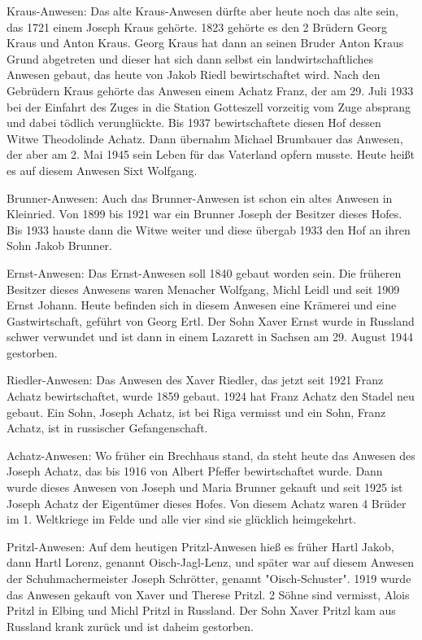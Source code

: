 Kraus-Anwesen: Das alte Kraus-Anwesen dürfte aber heute noch das alte sein, das
1721 einem Joseph Kraus gehörte. 1823 gehörte es den 2 Brüdern Georg Kraus und
Anton Kraus. Georg Kraus hat dann an seinen Bruder Anton Kraus Grund abgetreten
und dieser hat sich dann selbst ein landwirtschaftliches Anwesen gebaut, das
heute von Jakob Riedl bewirtschaftet wird. Nach den Gebrüdern Kraus gehörte das
Anwesen einem Achatz Franz, der am 29. Juli 1933 bei der Einfahrt des Zuges in
die Station Gotteszell vorzeitig vom Zuge absprang und dabei tödlich
verunglückte. Bis 1937 bewirtschaftete diesen Hof dessen Witwe Theodolinde
Achatz. Dann übernahm Michael Brumbauer das Anwesen, der aber am 2. Mai 1945
sein Leben für das Vaterland opfern musste. Heute heißt es auf diesem Anwesen
Sixt Wolfgang.

Brunner-Anwesen: Auch das Brunner-Anwesen ist schon ein altes Anwesen in
Kleinried. Von 1899 bis 1921 war ein Brunner Joseph der Besitzer dieses Hofes.
Bis 1933 hauste dann die Witwe weiter und diese übergab 1933 den Hof an ihren
Sohn Jakob Brunner.

Ernst-Anwesen: Das Ernst-Anwesen soll 1840 gebaut worden sein. Die früheren
Besitzer dieses Anwesens waren Menacher Wolfgang, Michl Leidl und seit 1909
Ernst Johann. Heute befinden sich in diesem Anwesen eine Krämerei und eine
Gastwirtschaft, geführt von Georg Ertl. Der Sohn Xaver Ernst wurde in Russland
schwer verwundet und ist dann in einem Lazarett in Sachsen am 29. August 1944
gestorben.

Riedler-Anwesen: Das Anwesen des Xaver Riedler, das jetzt seit 1921 Franz Achatz
bewirtschaftet, wurde 1859 gebaut. 1924 hat Franz Achatz den Stadel neu gebaut.
Ein Sohn, Joseph Achatz, ist bei Riga vermisst und ein Sohn, Franz Achatz, ist
in russischer Gefangenschaft.

Achatz-Anwesen: Wo früher ein Brechhaus stand, da steht heute das Anwesen des
Joseph Achatz, das bis 1916 von Albert Pfeffer bewirtschaftet wurde. Dann wurde
dieses Anwesen von Joseph und Maria Brunner gekauft und seit 1925 ist Joseph
Achatz der Eigentümer dieses Hofes. Von diesem Achatz waren 4 Brüder im 1.
Weltkriege im Felde und alle vier sind sie glücklich heimgekehrt.

Pritzl-Anwesen: Auf dem heutigen Pritzl-Anwesen hieß es früher Hartl Jakob, dann
Hartl Lorenz, genannt Oisch-Jagl-Lenz, und später war auf diesem Anwesen der
Schuhmachermeister Joseph Schrötter, genannt "Oisch-Schuster". 1919 wurde das
Anwesen gekauft von Xaver und Therese Pritzl. 2 Söhne sind vermisst, Alois
Pritzl in Elbing und Michl Pritzl in Russland. Der Sohn Xaver Pritzl kam aus
Russland krank zurück und ist daheim gestorben.

